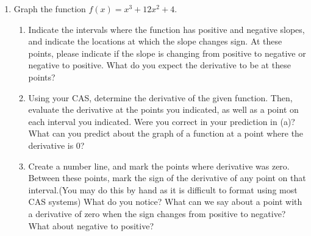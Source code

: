 \documentclass{ximera}
\begin{document}
\begin{enumerate}
\item{Graph the function $f(x)=x^3+12x^2+4$.}
\begin{enumerate}
\item{Indicate the intervals where the function has positive and negative slopes, and indicate the locations at which the slope changes sign. At these points, please indicate if the slope is changing from positive to negative or negative to positive. What do you expect the derivative to be at these points?}
\item{Using your CAS, determine the derivative of the given function. Then, evaluate the derivative at the points you indicated, as well as a point on each interval you indicated. Were you correct in your prediction in (a)? What can you predict about the graph of a function at a point where the derivative is 0?}
\item{Create a number line, and mark the points where derivative was zero. Between these points, mark the sign of the derivative of any point on that interval.(You may do this by hand as it is difficult to format using most CAS systems) What do you notice? What can we say about a point with a derivative of zero when the sign changes from positive to negative? What about negative to positive?}
\end{enumerate}



\begin{image}
\end{image}




\end{enumerate}
\end{document}
